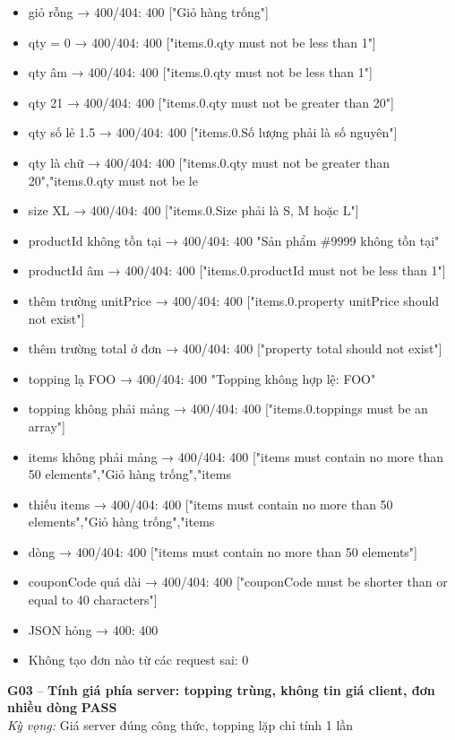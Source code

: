 \documentclass[a4paper,11pt]{article}
\newcommand{\ok}{\textcolor{okgreen}{\textbf{PASS}}}
\begin{document}
\begin{itemize}\footnotesize
\item \tick giỏ rỗng → 400/404: 400 ["Giỏ hàng trống"]
\item \tick qty = 0 → 400/404: 400 ["items.0.qty must not be less than 1"]
\item \tick qty âm → 400/404: 400 ["items.0.qty must not be less than 1"]
\item \tick qty 21 → 400/404: 400 ["items.0.qty must not be greater than 20"]
\item \tick qty số lẻ 1.5 → 400/404: 400 ["items.0.Số lượng phải là số nguyên"]
\item \tick qty là chữ → 400/404: 400 ["items.0.qty must not be greater than 20","items.0.qty must not be le
\item \tick size XL → 400/404: 400 ["items.0.Size phải là S, M hoặc L"]
\item \tick productId không tồn tại → 400/404: 400 "Sản phẩm \#9999 không tồn tại"
\item \tick productId âm → 400/404: 400 ["items.0.productId must not be less than 1"]
\item \tick thêm trường unitPrice → 400/404: 400 ["items.0.property unitPrice should not exist"]
\item \tick thêm trường total ở đơn → 400/404: 400 ["property total should not exist"]
\item \tick topping lạ FOO → 400/404: 400 "Topping không hợp lệ: FOO"
\item \tick topping không phải mảng → 400/404: 400 ["items.0.toppings must be an array"]
\item \tick items không phải mảng → 400/404: 400 ["items must contain no more than 50 elements","Giỏ hàng trống","items
\item \tick thiếu items → 400/404: 400 ["items must contain no more than 50 elements","Giỏ hàng trống","items
\item {} dòng → 400/404: 400 ["items must contain no more than 50 elements"]
\item \tick couponCode quá dài → 400/404: 400 ["couponCode must be shorter than or equal to 40 characters"]
\item \tick JSON hỏng → 400: 400
\item \tick Không tạo đơn nào từ các request sai: 0
\end{itemize}
\begin{minipage}{\textwidth}\vspace{4pt}\textbf{\textcolor{brew}{G03}} -- \textbf{Tính giá phía server: topping trùng, không tin giá client, đơn nhiều dòng} \hfill \ok\\
{\small\emph{Kỳ vọng:} Giá server đúng công thức, topping lặp chỉ tính 1 lần}
\end{minipage}
\end{document}
